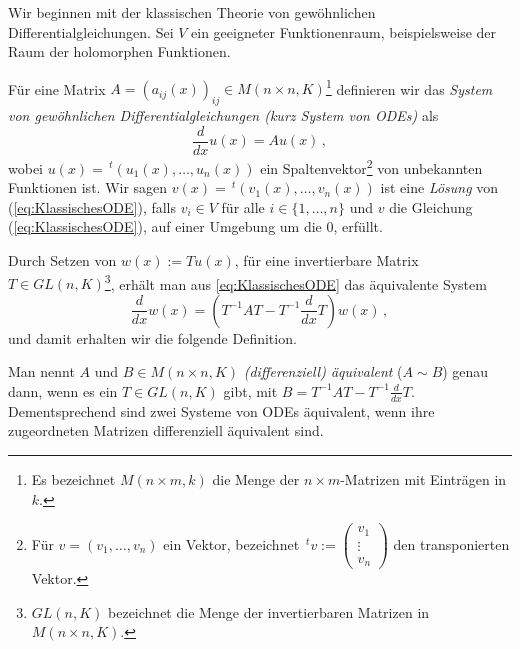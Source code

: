\begin{comment}
\cite[Chap 5.1.1]{hotta2007d} %
\end{comment}
Wir beginnen mit der klassischen Theorie von gewöhnlichen
Differentialgleichungen.
Sei $V$ ein geeigneter Funktionenraum, beispielsweise der Raum der holomorphen
Funktionen.
\begin{defn}
Für eine Matrix $A=(a_{ij}(x))_{ij}\in M(n\times n,K)$\footnote{
Es bezeichnet $M(n\times m,k)$ die Menge der $n\times m$-Matrizen mit Einträgen
in $k$.}
definieren wir das
\emph{System von gewöhnlichen Differentialgleichungen (kurz System von ODEs)}
als
\begin{equation}
\label{eq:KlassischesODE}
\frac{d}{dx}u(x)=Au(x) \,,
\end{equation}
wobei $u(x)=\,^t(u_1(x),\dots,u_n(x))$ ein
Spaltenvektor\footnote{Für $v=(v_1,\dots,v_n)$ ein Vektor, bezeichnet
$ \,^tv:= \begin{pmatrix} v_{1}\\ \vdots\\ v_{n} \end{pmatrix} $
den transponierten Vektor.} von unbekannten Funktionen ist.
Wir sagen $v(x)=\,^t(v_1(x),\dots,v_n(x))$ ist eine \emph{Lösung} von
(\ref{eq:KlassischesODE}), falls $ v_i\in V$ für alle
$i\in\{1,\dots,n\}$ und $v$ die Gleichung (\ref{eq:KlassischesODE}), auf einer
Umgebung um die $0$, erfüllt.
\end{defn}

Durch Setzen von $w(x):=Tu(x)$, für eine invertierbare Matrix $T\in
GL(n,K)$\footnote{$GL(n,K)$ bezeichnet die Menge der invertierbaren Matrizen in
$M(n\times n,K)$.},
erhält man aus \ref{eq:KlassischesODE} das äquivalente System
\[
\frac{d}{dx}w(x)=(T^{-1}AT - T^{-1}\frac{d}{dx}T)w(x) \,,
\]
und damit erhalten wir die folgende Definition.
\begin{defn}
Man nennt $A$ und $B\in M(n\times n,K)$ \emph{(differenziell) äquivalent}
($A\sim B$) genau dann, wenn es ein $T\in GL(n,K)$ gibt, mit
$B=T^{-1}AT-T^{-1}\frac{d}{dx}T$.
Dementsprechend sind zwei Systeme von ODEs äquivalent, wenn ihre zugeordneten
Matrizen differenziell äquivalent sind.
\end{defn}

\begin{comment}
$1=TT^{-1}$ $\rightsquigarrow$ $T'T^{-1}+T(T^{-1})'=0$\\
$1=T^{-1}T$ $\rightsquigarrow$ $(T^{-1})'T+T^{-1}T'=0$
\end{comment}

